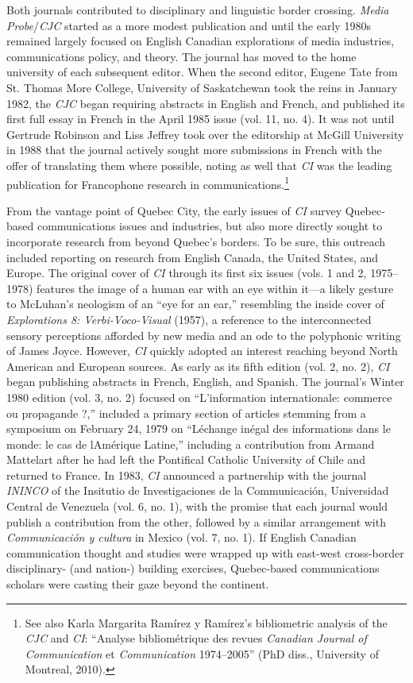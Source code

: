 \documentclass{tufte-handout}
\begin{document}
Both journals contributed to disciplinary and linguistic border
crossing. \emph{Media Probe}/\emph{CJC} started as a more modest
publication and until the early 1980s remained largely focused on
English Canadian explorations of media industries, communications
policy, and theory. The journal has moved to the home university of each
subsequent editor. When the second editor, Eugene Tate from St. Thomas
More College, University of Saskatchewan took the reins in January 1982,
the \emph{CJC} began requiring abstracts in English and French, and
published its first full essay in French in the April 1985 issue (vol.
11, no. 4). It was not until Gertrude Robinson and Liss Jeffrey took
over the editorship at McGill University in 1988 that the journal
actively sought more submissions in French with the offer of translating
them where possible, noting as well that \emph{CI} was the leading
publication for Francophone research in communications.\footnote{See
  also Karla Margarita Ramírez y Ramírez's bibliometric analysis of the
  \emph{CJC} and \emph{CI}: ``Analyse bibliométrique des revues
  \emph{Canadian Journal of Communication} et \emph{Communication}
  1974--2005'' (PhD diss., University of Montreal, 2010).}

From the vantage point of Quebec City, the early issues of \emph{CI}
survey Quebec-based communications issues and industries, but also more
directly sought to incorporate research from beyond Quebec's borders. To
be sure, this outreach included reporting on research from English
Canada, the United States, and Europe. The original cover of \emph{CI}
through its first six issues (vols. 1 and 2, 1975--1978) features the
image of a human ear with an eye within it---a likely gesture to
McLuhan's neologism of an ``eye for an ear,'' resembling the inside
cover of \emph{Explorations 8: Verbi-Voco-Visual} (1957), a reference to
the interconnected sensory perceptions afforded by new media and an ode
to the polyphonic writing of James Joyce. However, \emph{CI} quickly
adopted an interest reaching beyond North American and European sources.
As early as its fifth edition (vol. 2, no. 2), \emph{CI} began
publishing abstracts in French, English, and Spanish. The journal's
Winter 1980 edition (vol. 3, no. 2) focused on ``L'information
internationale: commerce ou propagande ?,'' included a primary section
of articles stemming from a symposium on February 24, 1979 on
``L\textquotesingle échange inégal des informations dans le monde: le
cas de l\textquotesingle Amérique Latine,'' including a contribution
from Armand Mattelart after he had left the Pontifical Catholic
University of Chile and returned to France. In 1983, \emph{CI} announced
a partnership with the journal \emph{ININCO} of the Insitutio de
Investigaciones de la Communicación, Universidad Central de Venezuela
(vol. 6, no. 1), with the promise that each journal would publish a
contribution from the other, followed by a similar arrangement with
\emph{Communicación y cultura} in Mexico (vol. 7, no. 1). If English
Canadian communication thought and studies were wrapped up with
east-west cross-border disciplinary- (and nation-) building exercises,
Quebec-based communications scholars were casting their gaze beyond the
continent.
\end{document}
